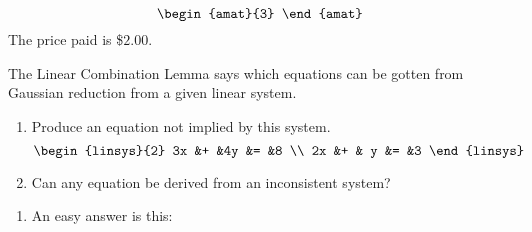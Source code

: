 \begin{exercises}
\begin{answer}
\begin{equation*}
\begin{amat}{3}
       \end{amat}
     \end{equation*}
     The price paid is \$$2.00$.
   \end{answer}
  \recommended \item 
   The Linear Combination Lemma says which equations can be gotten from
   Gaussian reduction from a given linear system.
   \begin{enumerate}
     \item Produce an equation not implied by this system.
       \begin{equation*}
         \begin{linsys}{2}
           3x  &+  &4y  &=  &8 \\
           2x  &+  & y  &=  &3 
         \end{linsys}
       \end{equation*}
     \item Can any equation be derived from an inconsistent system?
   \end{enumerate}
   \begin{answer}
     \begin{enumerate}
        \item An easy answer is this:

\end{enumerate}
\end{answer}
\end{exercises}
